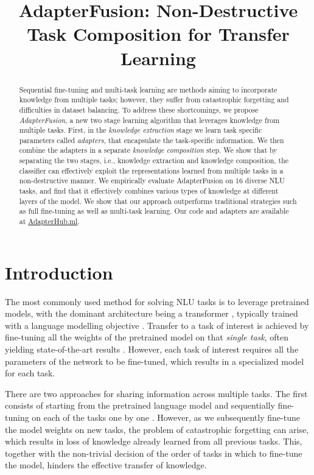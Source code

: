 \title{AdapterFusion: Non-Destructive Task Composition for Transfer Learning}

\begin{abstract}
Sequential fine-tuning and multi-task learning are methods aiming to incorporate knowledge from multiple tasks; however, they suffer from catastrophic forgetting and difficulties in dataset balancing. To address these shortcomings, we propose \emph{AdapterFusion}, a new two stage learning algorithm that leverages knowledge from multiple tasks. First, in the \textit{knowledge extraction} stage we learn task specific parameters called \textit{adapters}, that encapsulate the task-specific information. We then combine the adapters in a separate \textit{knowledge composition} step. We show that by separating the two stages, i.e., knowledge extraction and knowledge composition, the classifier can effectively exploit the representations learned from multiple tasks in a non-destructive manner. We empirically evaluate AdapterFusion on 16 diverse NLU tasks, and find that it effectively combines various types of knowledge at different layers of the model. We show that our approach outperforms traditional strategies such as full  fine-tuning as well as multi-task learning. Our code and adapters are available at \href{https://AdapterHub.ml}{AdapterHub.ml}.
\end{abstract}

\section{Introduction}
\label{introduction}

The most commonly used method for solving NLU tasks is to leverage pretrained models, with the dominant architecture being a transformer \cite{Vaswani17},  typically trained with a language modelling objective \cite{devlin2018bert, radford2018improving, liu2019roberta}. Transfer to a task of interest is achieved by fine-tuning all the weights of the pretrained model on that \emph{single task}, often yielding state-of-the-art results  \cite{zhang2017survey, ruder2017, howard2018universal, peters2019tune}. However, each task of interest requires all the parameters of the network to be fine-tuned, which results in a specialized model for each task. 

There are two approaches for sharing information across multiple tasks. The first consists of starting from the pretrained language model and sequentially fine-tuning on each of the tasks one by one \cite{phang2018sentence}. However, as we subsequently fine-tune the model weights on new tasks, the problem of catastrophic forgetting \cite{mccloskey1989catastrophic,french1999catastrophic} can arise, which results in loss of knowledge already learned from all previous tasks. This, together with the non-trivial decision of the order of tasks in which to fine-tune the model, hinders the effective transfer of knowledge. 

